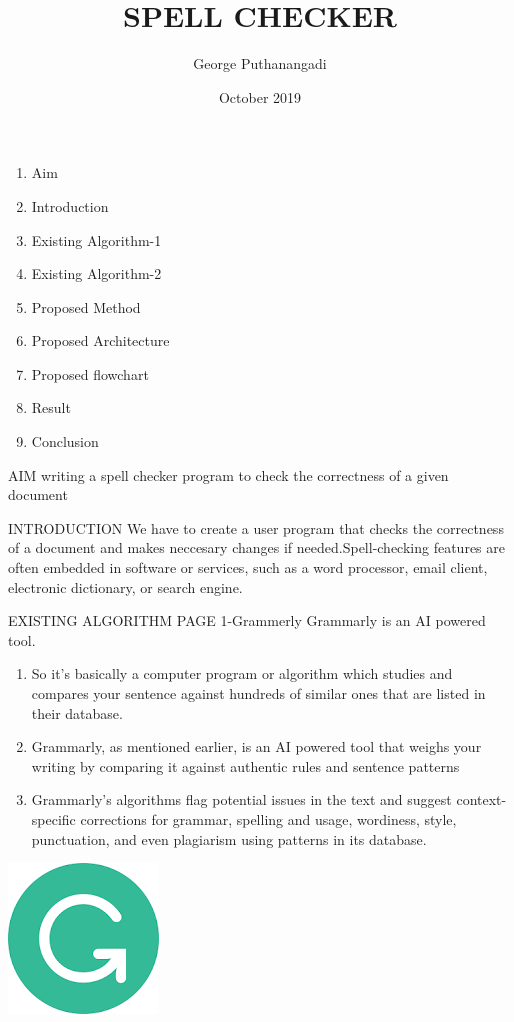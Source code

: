 \documentclass{beamer}
\title[DOCUMENT SPELL CHECKER]{SPELL CHECKER}
\author{George Puthanangadi}
\institute{Federal Institute Of Science And Technology}
\date{October 2019}
\begin{document}
\begin{frame}
\titlepage
\end{frame}
\begin{frame}
\begin{enumerate}
\item Aim
\item Introduction
\item Existing Algorithm-1
\item Existing Algorithm-2
\item Proposed Method
\item Proposed Architecture
\item Proposed flowchart
\item Result
\item Conclusion
\end{enumerate}
\end{frame}
\begin{frame}{AIM}
writing a spell checker program to check the correctness of a given document
\end{frame}
\begin{frame}{INTRODUCTION}
We have to create a user program that checks the correctness of a document and makes neccesary changes if needed.Spell-checking features are often embedded in software or services, such as a word processor, email client, electronic dictionary, or search engine. 
\end{frame}
\begin{frame}{EXISTING ALGORITHM PAGE 1-Grammerly}
 Grammarly is an AI powered tool.
 \begin{enumerate}
 
 

\item So it’s basically a computer program or algorithm  which studies and compares your sentence against hundreds of similar ones that are listed in their database.
\item Grammarly, as mentioned earlier, is an AI powered tool that weighs your writing by comparing it against authentic rules and sentence patterns
\item Grammarly’s algorithms flag potential issues in the text and suggest context-specific corrections for grammar, spelling and usage, wordiness, style, punctuation, and even plagiarism using patterns in its database.

\end{enumerate}

\end{frame}
\begin{frame}
\includegraphics[scale=0.5]{grammer.png} 
\end{frame}
\end{document}

